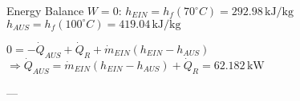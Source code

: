 Energy Balance \( W = 0 \):  
\( h_{EIN} = h_f(70^\circ C) = 292.98 \, \text{kJ/kg} \)  
\( h_{AUS} = h_f(100^\circ C) = 419.04 \, \text{kJ/kg} \)  

\( 0 = -\dot{Q}_{AUS} + \dot{Q}_R + \dot{m}_{EIN}(h_{EIN} - h_{AUS}) \)  
\( \Rightarrow \dot{Q}_{AUS} = \dot{m}_{EIN}(h_{EIN} - h_{AUS}) + \dot{Q}_R = 62.182 \, \text{kW} \)  

---